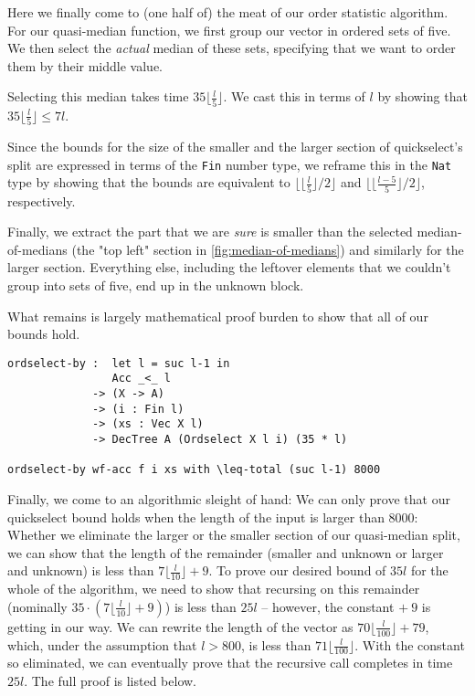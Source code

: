 Here we finally come to (one half of) the meat of our order statistic algorithm. For our quasi-median function, we first group our vector in ordered sets of five. We then select the \emph{actual} median of these sets, specifying that we want to order them by their middle value.

Selecting this median takes time $35 \lfloor \frac l 5 \rfloor$. We cast this in terms of $l$ by showing that $35 \lfloor \frac l 5 \rfloor \leq 7 l$.

Since the bounds for the size of the smaller and the larger section of quickselect's split are expressed in terms of the \texttt{Fin} number type, we reframe this in the \texttt{Nat} type by showing that the bounds are equivalent to $\lfloor \lfloor \frac l 5 \rfloor / 2 \rfloor$ and $\lfloor \lfloor \frac {l - 5} 5 \rfloor / 2 \rfloor$, respectively.

Finally, we extract the part that we are \emph{sure} is smaller than the selected median-of-medians (the "top left" section in \autoref{fig:median-of-medians}) and similarly for the larger section. Everything else, including the leftover elements that we couldn't group into sets of five, end up in the unknown block.

What remains is largely mathematical proof burden to show that all of our bounds hold.

\begin{lstlisting}[caption={Quickselect},label={lst:median:quickselect},emph={ordselect,by}]
ordselect-by :  let l = suc l-1 in
                Acc _<_ l
             -> (X -> A)
             -> (i : Fin l)
             -> (xs : Vec X l)
             -> DecTree A (Ordselect X l i) (35 * l)

ordselect-by wf-acc f i xs with \leq-total (suc l-1) 8000
\end{lstlisting}

Finally, we come to an algorithmic sleight of hand: We can only prove that our quickselect bound holds when the length of the input is larger than 8000: Whether we eliminate the larger or the smaller section of our quasi-median split, we can show that the length of the remainder (smaller and unknown or larger and unknown) is less than $7\lfloor\frac l {10}\rfloor + 9$. To prove our desired bound of $35l$ for the whole of the algorithm, we need to show that recursing on this remainder (nominally $35\cdot(7\lfloor\frac l {10} \rfloor + 9)$) is less than $25l$ -- however, the constant $+~9$ is getting in our way. We can rewrite the length of the vector as $70\lfloor\frac l {100}\rfloor + 79$, which, under the assumption that $l > 800$, is less than $71\lfloor\frac l {100}\rfloor$. With the constant so eliminated, we can eventually prove that the recursive call completes in time $25l$. The full proof is listed below.

